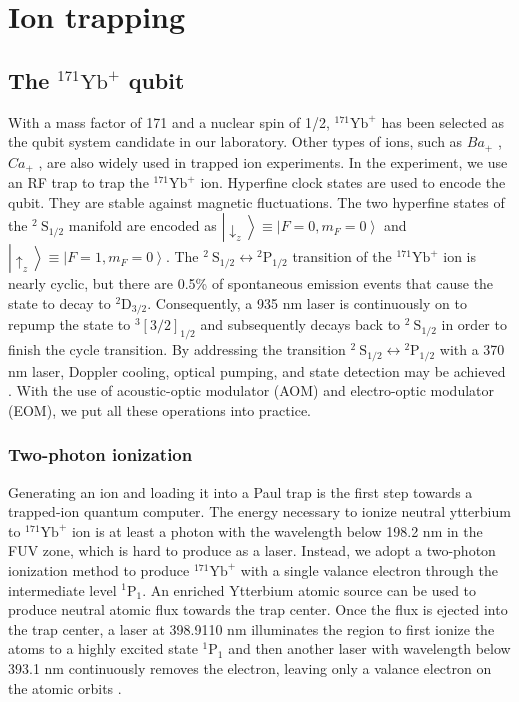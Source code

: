 
\chapter{Ion trapping}

\section{The \texorpdfstring{${ }^{171} \mathrm{Yb}^{+}$}{} qubit}

With a mass factor of 171 and a nuclear spin of 1/2, ${ }^{171} \mathrm{Yb}^{+}$ has been selected as the qubit system candidate in our laboratory. Other types of ions, such as $Ba_+$ \cite{RN259,RN156,RN253}, $Ca_+$ \cite{RN164}, are also widely used in trapped ion experiments. In the experiment, we use an RF trap to trap the ${ }^{171} \mathrm{Yb}^{+}$ ion. Hyperfine clock states are used to encode the qubit. They are stable against magnetic fluctuations. The two hyperfine states of the ${ }^2 \mathrm{~S}_{1 / 2}$ manifold are encoded as $\left|\downarrow_z\right\rangle \equiv\left|F=0, m_F=0\right\rangle$ and $\left|\uparrow_z\right\rangle \equiv\left|F=1, m_F=0\right\rangle$. The ${ }^2 \mathrm{~S}_{1 / 2} \leftrightarrow{ }^2 \mathrm{P}_{1 / 2}$ transition of the ${ }^{171} \mathrm{Yb}^{+}$ ion is nearly cyclic, but there are 0.5\% of spontaneous emission events that cause the state to decay to ${ }^2 \mathrm{D}_{3 / 2}$. Consequently, a 935 nm laser is continuously on to repump the state to ${ }^{3} [3 / 2]_{1 / 2}$ and subsequently decays back to ${ }^2 \mathrm{~S}_{1 / 2}$ in order to finish the cycle transition. By addressing the transition ${ }^2 \mathrm{~S}_{1 / 2} \leftrightarrow{ }^2 \mathrm{P}_{1 / 2}$ with a 370 nm laser, Doppler cooling, optical pumping, and state detection may be achieved \cite{RN281}. With the use of acoustic-optic modulator (AOM) and electro-optic modulator (EOM), we put all these operations into practice.

\subsection{Two-photon ionization}

Generating an ion and loading it into a Paul trap is the first step towards a trapped-ion quantum computer. The energy necessary to ionize neutral ytterbium to ${ }^{171} \mathrm{Yb}^{+}$ ion is at least a photon with the wavelength below 198.2 nm in the FUV zone, which is hard to produce as a laser. Instead, we adopt a two-photon ionization method to produce ${ }^{171} \mathrm{Yb}^{+}$ with a single valance electron through the intermediate level ${ }^1 \mathrm{P}_1$. An enriched Ytterbium atomic source can be used to produce neutral atomic flux towards the trap center. Once the flux is ejected into the trap center, a laser at 398.9110 nm illuminates the region to first ionize the atoms to a highly excited state ${ }^1 \mathrm{P}_1$ and then another laser with wavelength below 393.1 nm continuously removes the electron, leaving only a valance electron on the atomic orbits \cite{RN74,RN132,RN85}.

